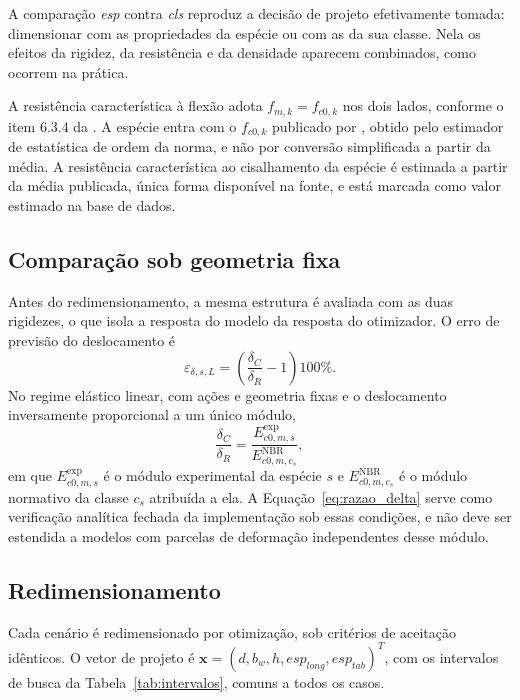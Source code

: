 A comparação \emph{esp} contra \emph{cls} reproduz a decisão de projeto efetivamente tomada: dimensionar com as propriedades da espécie ou com as da sua classe. Nela os efeitos da rigidez, da resistência e da densidade aparecem combinados, como ocorrem na prática.

A resistência característica à flexão adota $f_{m,k}=f_{c0,k}$ nos dois lados, conforme o item 6.3.4 da \textcite{NBR7190-1:2022}. A espécie entra com o $f_{c0,k}$ publicado por \textcite{DiasLahr2004}, obtido pelo estimador de estatística de ordem da norma, e não por conversão simplificada a partir da média. A resistência característica ao cisalhamento da espécie é estimada a partir da média publicada, única forma disponível na fonte, e está marcada como valor estimado na base de dados.

\subsection{Comparação sob geometria fixa}\label{sec:geometria_fixa}

Antes do redimensionamento, a mesma estrutura é avaliada com as duas rigidezes, o que isola a resposta do modelo da resposta do otimizador. O erro de previsão do deslocamento é
\begin{equation}
\varepsilon_{\delta,s,L}=\left(\frac{\delta_C}{\delta_R}-1\right)100\%.
\label{eq:erro_delta}
\end{equation}
No regime elástico linear, com ações e geometria fixas e o deslocamento inversamente proporcional a um único módulo,
\begin{equation}
\frac{\delta_C}{\delta_R}=\frac{E_{c0,m,s}^{\mathrm{exp}}}{E_{c0,m,c_s}^{\mathrm{NBR}}},
\label{eq:razao_delta}
\end{equation}
em que $E_{c0,m,s}^{\mathrm{exp}}$ é o módulo experimental da espécie $s$ e $E_{c0,m,c_s}^{\mathrm{NBR}}$ é o módulo normativo da classe $c_s$ atribuída a ela. A Equação~\eqref{eq:razao_delta} serve como verificação analítica fechada da implementação sob essas condições, e não deve ser estendida a modelos com parcelas de deformação independentes desse módulo.

\subsection{Redimensionamento}\label{sec:optimisation}

Cada cenário é redimensionado por otimização, sob critérios de aceitação idênticos. O vetor de projeto é $\mathbf{x}=(d,b_w,h,esp_{long},esp_{tab})^{T}$, com os intervalos de busca da Tabela~\ref{tab:intervalos}, comuns a todos os casos.

